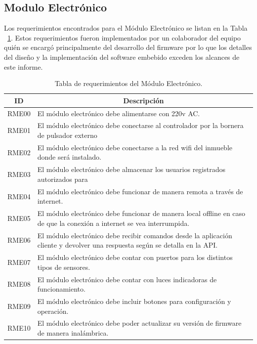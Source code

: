 \subsection{Modulo Electrónico}
Los requerimientos encontrados para el Módulo Electrónico se listan en la Tabla ~\ref{table:req_modulo_electro}.
Estos requerimientos fueron implementados por un colaborador del equipo quién se encargó principalmente del desarrollo del firmware por lo que los detalles del diseño y la implementación del software embebido exceden los alcances de este informe. 
\begin{table}[ht]
	\begin{tabular}{|c|m{12cm}|}
		\hline
		\textbf{ID} & \multicolumn{1}{c|}{\textbf{Descripción}}                                                                                    \\ \hline
		RME00       & El módulo electrónico debe alimentarse con 220v AC.                                                                          \\ \hline
		RME01       & El módulo electrónico debe conectarse al controlador por la bornera de pulsador externo                                      \\ \hline
		RME02       & El módulo electrónico debe conectarse a la red wifi del inmueble donde será instalado.                                       \\ \hline
		RME03       & El módulo electrónico debe almacenar los usuarios registrados autorizados para                                               \\ \hline
		RME04       & El módulo electrónico debe funcionar de manera remota a través de internet.                                                  \\ \hline
		RME05       & El módulo electrónico debe funcionar de manera local offline en caso de que la conexión a internet se vea interrumpida.      \\ \hline
		RME06       & El módulo electrónico debe recibir comandos desde la aplicación cliente y devolver una respuesta según se detalla en la API. \\ \hline
		RME07       & El módulo electrónico debe contar con puertos para los distintos tipos de sensores.                                          \\ \hline
		RME08       & El módulo electrónico debe contar con luces indicadoras de funcionamiento.                                                   \\ \hline
		RME09       & El módulo electrónico debe incluir botones para configuración y operación.                                                   \\ \hline
		RME10       & El módulo electrónico debe poder actualizar su versión de firmware de manera inalámbrica.                                    \\ \hline
	\end{tabular}
	\caption[Requerimientos del Módulo Electrónico]{Tabla de requerimientos del Módulo Electrónico.}
	\label{table:req_modulo_electro}
\end{table}
